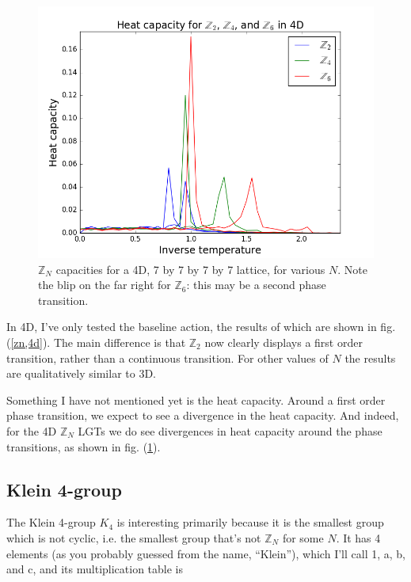 \documentclass[9pt,twocolumn,twoside]{article}
\begin{document}
\begin{figure}[h!]
	\begin{centering}
	\includegraphics[width=\columnwidth]{heatcapz2z4z6,4d}
	\caption{$\mathbb{Z}_N$ capacities for a 4D, 7 by 7 by 7 by 7 lattice, for various $N$.  Note the blip on the far right for $\mathbb{Z}_6$: this may be a second phase transition. }
	\label{heatcapz}
	\end{centering}
\end{figure}

In 4D, I've only tested the baseline action, the results of which are shown in fig. (\ref{zn,4d}).  The main difference is that $\mathbb{Z}_2$ now clearly displays a first order transition, rather than a continuous transition.  For other values of $N$ the results are qualitatively similar to 3D. 

Something I have not mentioned yet is the heat capacity.  Around a first order phase transition, we expect to see a divergence in the heat capacity.  And indeed, for the 4D $\mathbb{Z}_N$ LGTs we do see divergences in heat capacity around the phase transitions, as shown in fig. (\ref{heatcapz}).

\subsection{Klein 4-group}
The Klein 4-group $K_4$ is interesting primarily because it is the smallest group which is not cyclic, i.e. the smallest group that's not $\mathbb{Z}_N$ for some $N$.  It has 4 elements (as you probably guessed from the name, ``Klein''), which I'll call 1, a, b, and c, and its multiplication table is
\end{document}
